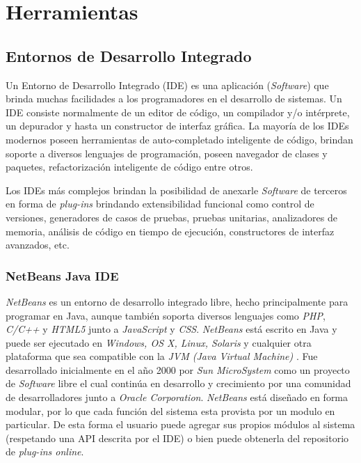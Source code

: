 \section{Herramientas}
\subsection{Entornos de Desarrollo Integrado}
Un Entorno de Desarrollo Integrado (IDE) es una aplicaci\'on (\textit{Software}) que brinda muchas facilidades a los programadores en el desarrollo de sistemas. Un IDE consiste normalmente de un editor de c\'odigo, un compilador y/o int\'erprete, un depurador y hasta un constructor de interfaz gr\'afica. La mayor\'ia de los IDEs modernos poseen herramientas de auto-completado inteligente de c\'odigo, brindan soporte a diversos lenguajes de programaci\'on, poseen navegador de clases y paquetes, refactorizaci\'on  inteligente de c\'odigo entre otros.

Los IDEs m\'as complejos brindan la posibilidad de anexarle \textit{Software} de terceros en forma de \textit{plug-ins} brindando extensibilidad funcional como control de versiones, generadores de casos de pruebas, pruebas unitarias, analizadores de memoria, an\'alisis de c\'odigo en tiempo de ejecuci\'on, constructores de interfaz avanzados, etc.

\subsubsection{NetBeans Java IDE}
\textit{NetBeans} es un entorno de desarrollo integrado libre, hecho principalmente para programar en Java, aunque tambi\'en soporta diversos lenguajes como \textit{PHP},\textit{ C/C++} y \textit{HTML5} junto a \textit{JavaScript} y \textit{CSS}. \textit{NetBeans} est\'a escrito en Java y puede ser ejecutado en \textit{Windows, OS X, Linux, Solaris} y cualquier otra plataforma que sea compatible con la \textit{JVM (Java Virtual Machine)} \cite{netbeans}. Fue desarrollado inicialmente en el a\~no 2000 por \textit{Sun MicroSystem} como un proyecto de \textit{Software} libre el cual contin\'ua en desarrollo y crecimiento por una comunidad de desarrolladores junto a \textit{Oracle Corporation}.
\textit{NetBeans} est\'a dise\~nado en forma modular, por lo que cada funci\'on del sistema esta provista por un modulo en particular. De esta forma el usuario puede agregar sus propios m\'odulos al sistema (respetando una API descrita por el IDE) o bien puede obtenerla del repositorio de \textit{plug-ins online}.